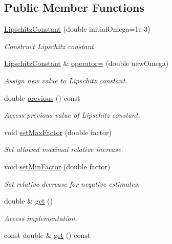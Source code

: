 \subsection*{Public Member Functions}
\begin{DoxyCompactItemize}
\item 
\hyperlink{classSpacy_1_1LipschitzConstant_aea30ebc1ddf842797ac52a8f4fac524d}{Lipschitz\+Constant} (double initial\+Omega=1e-\/3)
\begin{DoxyCompactList}\small\item\em Construct Lipschitz constant. \end{DoxyCompactList}\item 
\hyperlink{classSpacy_1_1LipschitzConstant}{Lipschitz\+Constant} \& \hyperlink{classSpacy_1_1LipschitzConstant_a778d00f928adba29778cf51361e3b8ee}{operator=} (double new\+Omega)
\begin{DoxyCompactList}\small\item\em Assign new value to Lipschitz constant. \end{DoxyCompactList}\item 
double \hyperlink{classSpacy_1_1LipschitzConstant_aa4fc084b53474a9e6a0eb651f408add7}{previous} () const 
\begin{DoxyCompactList}\small\item\em Access previous value of Lipschitz constant. \end{DoxyCompactList}\item 
void \hyperlink{classSpacy_1_1LipschitzConstant_a8f9d0f84f4ca6eba5844d08a2151f18d}{set\+Max\+Factor} (double factor)
\begin{DoxyCompactList}\small\item\em Set allowed maximal relative increase. \end{DoxyCompactList}\item 
void \hyperlink{classSpacy_1_1LipschitzConstant_a8a2adae190c7534076d2b117ee802049}{set\+Min\+Factor} (double factor)
\begin{DoxyCompactList}\small\item\em Set relative decrease for negative estimates. \end{DoxyCompactList}\item 
double \& \hyperlink{classSpacy_1_1Mixin_1_1Get_aaa3afedcb9b9e943f81d1686b70417db}{get} ()\hypertarget{classSpacy_1_1Mixin_1_1Get_aaa3afedcb9b9e943f81d1686b70417db}{}\label{classSpacy_1_1Mixin_1_1Get_aaa3afedcb9b9e943f81d1686b70417db}

\begin{DoxyCompactList}\small\item\em Access implementation. \end{DoxyCompactList}\item 
const double \& \hyperlink{classSpacy_1_1Mixin_1_1Get_ab00e550fb3ac8208d0a25e17e705a9fc}{get} () const\hypertarget{classSpacy_1_1Mixin_1_1Get_ab00e550fb3ac8208d0a25e17e705a9fc}{}\label{classSpacy_1_1Mixin_1_1Get_ab00e550fb3ac8208d0a25e17e705a9fc}


\end{DoxyCompactItemize}
